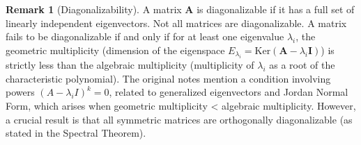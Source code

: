 \documentclass[12pt, letterpaper]{article}
\theoremstyle{definition}
\newtheorem{remark}{Remark}[section]
\newcommand{\mat}[1]{\mathbf{#1}} %
\newcommand{\Ker}{\text{Ker}}
\begin{document}
\begin{remark}[Diagonalizability]
A matrix $\mat{A}$ is diagonalizable if it has a full set of linearly independent eigenvectors. Not all matrices are diagonalizable. A matrix fails to be diagonalizable if and only if for at least one eigenvalue $\lambda_i$, the geometric multiplicity (dimension of the eigenspace $E_{\lambda_i} = \Ker(\mat{A}-\lambda_i \mat{I})$) is strictly less than the algebraic multiplicity (multiplicity of $\lambda_i$ as a root of the characteristic polynomial). The original notes mention a condition involving powers $(A-\lambda_i I)^k = 0$, related to generalized eigenvectors and Jordan Normal Form, which arises when geometric multiplicity < algebraic multiplicity.
However, a crucial result is that all symmetric matrices are orthogonally diagonalizable (as stated in the Spectral Theorem).
\end{remark}
\end{document}
